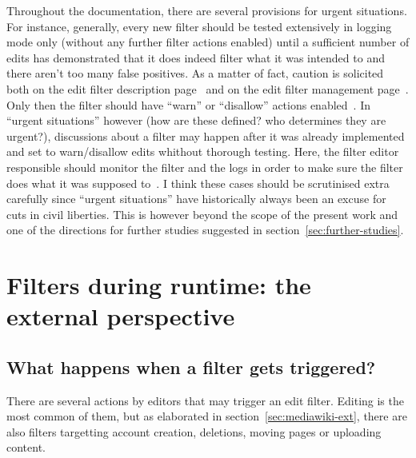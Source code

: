 Throughout the documentation, there are several provisions for urgent situations.
For instance, generally, every new filter should be tested extensively in logging mode only (without any further filter actions enabled) until a sufficient number of edits has demonstrated that it does indeed filter what it was intended to and there aren't too many false positives.
As a matter of fact, caution is solicited both on the edit filter description page~\cite{Wikipedia:EditFilter} and on the edit filter management page~\cite{Wikipedia:EditFilterManagement}.
Only then the filter should have ``warn'' or ``disallow'' actions enabled~\cite{Wikipedia:EditFilter}.
In ``urgent situations'' however (how are these defined? who determines they are urgent?), discussions about a filter may happen after it was already implemented and set to warn/disallow edits whithout thorough testing.
Here, the filter editor responsible should monitor the filter and the logs in order to make sure the filter does what it was supposed to~\cite{Wikipedia:EditFilter}.
I think these cases should be scrutinised extra carefully since ``urgent situations'' have historically always been an excuse for cuts in civil liberties.
This is however beyond the scope of the present work and one of the directions for further studies suggested in section~\ref{sec:further-studies}.


\section{Filters during runtime: the external perspective}
\subsection{What happens when a filter gets triggered?}

There are several actions by editors that may trigger an edit filter.
Editing is the most common of them, but as elaborated in section~\ref{sec:mediawiki-ext}, there are also filters targetting account creation, deletions, moving pages or uploading content.

